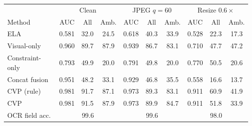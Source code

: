 \begin{tabular}{lccccccccc}
\toprule
 & \multicolumn{3}{c}{Clean} & \multicolumn{3}{c}{JPEG $q{=}60$} & \multicolumn{3}{c}{Resize $0.6\times$}\\
Method & AUC & All & Amb. & AUC & All & Amb. & AUC & All & Amb.\\
\midrule
ELA & 0.581 & 32.0 & 24.5 & 0.618 & 40.3 & 33.9 & 0.528 & 22.3 & 17.3\\
Visual-only & 0.960 & 89.7 & 87.9 & 0.939 & 86.7 & 83.1 & 0.710 & 47.7 & 47.2\\
Constraint-only & 0.793 & 49.9 & 20.0 & 0.791 & 49.8 & 20.0 & 0.770 & 50.5 & 20.6\\
Concat fusion & 0.951 & 48.2 & 33.1 & 0.929 & 46.8 & 35.5 & 0.558 & 16.6 & 13.7\\
CVP (rule) & 0.981 & 91.7 & 87.1 & 0.973 & 89.3 & 83.1 & 0.911 & 60.9 & 41.9\\
CVP & 0.981 & 91.5 & 87.9 & 0.973 & 89.9 & 84.7 & 0.911 & 51.8 & 33.9\\
\midrule
OCR field acc. & \multicolumn{3}{c}{99.6} & \multicolumn{3}{c}{99.6} & \multicolumn{3}{c}{98.0}\\
\bottomrule
\end{tabular}
